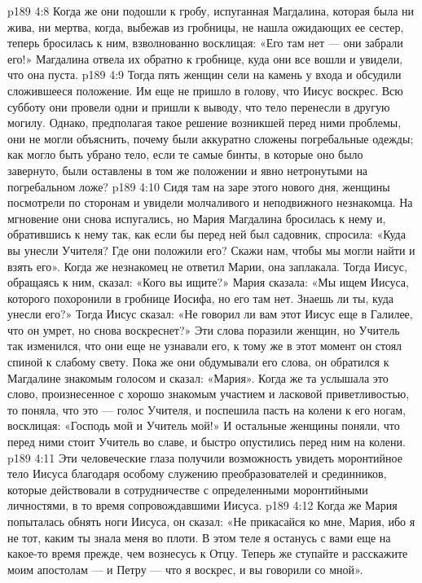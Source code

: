 \vs p189 4:8 Когда же они подошли к гробу, испуганная Магдалина, которая была ни жива, ни мертва, когда, выбежав из гробницы, не нашла ожидающих ее сестер, теперь бросилась к ним, взволнованно восклицая: «Его там нет --- они забрали его!» Магдалина отвела их обратно к гробнице, куда они все вошли и увидели, что она пуста.
\vs p189 4:9 Тогда пять женщин сели на камень у входа и обсудили сложившееся положение. Им еще не пришло в голову, что Иисус воскрес. Всю субботу они провели одни и пришли к выводу, что тело перенесли в другую могилу. Однако, предполагая такое решение возникшей перед ними проблемы, они не могли объяснить, почему были аккуратно сложены погребальные одежды; как могло быть убрано тело, если те самые бинты, в которые оно было завернуто, были оставлены в том же положении и явно нетронутыми на погребальном ложе?
\vs p189 4:10 \pc Сидя там на заре этого нового дня, женщины посмотрели по сторонам и увидели молчаливого и неподвижного незнакомца. На мгновение они снова испугались, но Мария Магдалина бросилась к нему и, обратившись к нему так, как если бы перед ней был садовник, спросила: «Куда вы унесли Учителя? Где они положили его? Скажи нам, чтобы мы могли найти и взять его». Когда же незнакомец не ответил Марии, она заплакала. Тогда Иисус, обращаясь к ним, сказал: «Кого вы ищите?» Мария сказала: «Мы ищем Иисуса, которого похоронили в гробнице Иосифа, но его там нет. Знаешь ли ты, куда унесли его?» Тогда Иисус сказал: «Не говорил ли вам этот Иисус еще в Галилее, что он умрет, но снова воскреснет?» Эти слова поразили женщин, но Учитель так изменился, что они еще не узнавали его, к тому же в этот момент он стоял спиной к слабому свету. Пока же они обдумывали его слова, он обратился к Магдалине знакомым голосом и сказал: «Мария». Когда же та услышала это слово, произнесенное с хорошо знакомым участием и ласковой приветливостью, то поняла, что это --- голос Учителя, и поспешила пасть на колени к его ногам, восклицая: «Господь мой и Учитель мой!» И остальные женщины поняли, что перед ними стоит Учитель во славе, и быстро опустились перед ним на колени.
\vs p189 4:11 Эти человеческие глаза получили возможность увидеть моронтийное тело Иисуса благодаря особому служению преобразователей и срединников, которые действовали в сотрудничестве с определенными моронтийными личностями, в то время сопровождавшими Иисуса.
\vs p189 4:12 \pc Когда же Мария попыталась обнять ноги Иисуса, он сказал: «Не прикасайся ко мне, Мария, ибо я не тот, каким ты знала меня во плоти. В этом теле я останусь с вами еще на какое\hyp{}то время прежде, чем вознесусь к Отцу. Теперь же ступайте и расскажите моим апостолам --- и Петру --- что я воскрес, и вы говорили со мной».
